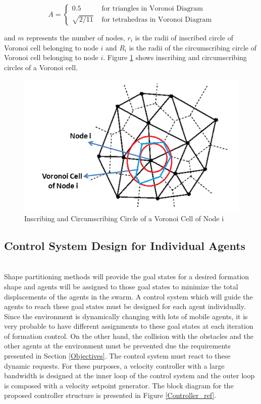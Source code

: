 \begin{equation}
A = \left\{ \begin{array}{rl}
0.5                               &\mbox{ for triangles in Voronoi Diagram} \\
\sqrt{2/11}                   &\mbox{ for tetrahedras in Voronoi Diagram}
\end{array} \right.
\end{equation}
		
and $m$ represents the number of nodes, $r_i$ is the radii of inscribed circle of Voronoi cell belonging to node $i$ and $R_i$ is the radii of the circumscribing circle of Voronoi cell belonging to node $i$. Figure \ref{inscribe_circumscribe} shows inscribing and circumscribing circles of a Voronoi cell.
	
\begin{figure}[H]
\caption{Inscribing and Circumscribing Circle of a Voronoi Cell of Node i} \label{inscribe_circumscribe}
\centering
\includegraphics[scale = 0.70]{voronoi2}
\end{figure}
	
\subsection{Control System Design for Individual Agents}\hspace{0pt}\label{lqr_design}  \\ 
Shape partitioning methods will provide the goal states for a desired formation shape and agents will be assigned to those goal states to minimize the total displacements of the agents in the swarm. A control system which will guide the agents to reach these goal states must be designed for each agent individually. Since the environment is dynamically changing with lots of  mobile agents, it is very probable to have different assignments to these goal states at each iteration of formation control. On the other hand, the collision with the obstacles and the other agents at the environment must be prevented due the requirements presented in Section \ref{Objectives}. The control system must react to these dynamic requests. For these purposes, a velocity controller with a large bandwidth is designed at the inner loop of the control system and the outer loop is composed with a velocity setpoint generator. The block diagram for the proposed controller structure is presented in Figure \ref{Controller_ref}.

